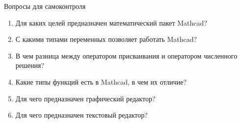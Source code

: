 

Вопросы для самоконтроля
\begin{enumerate}
	\item Для каких целей предназначен математический пакет Mathcad?
	\item С какими типами переменных позволяет работать Mathcad?
	\item В чем разница между оператором присваивания и оператором численного решения?
	\item Какие типы функций есть в Mathcad, в чем их отличие?
	\item  Для чего предназначен графический редактор?
	\item Для чего предназначен текстовый редактор?
\end{enumerate}